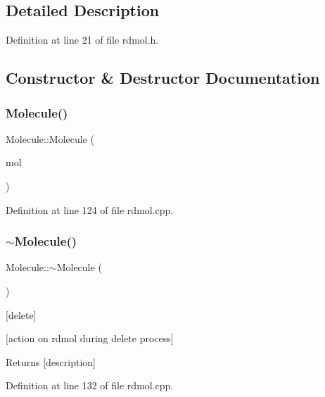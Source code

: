 \subsection{Detailed Description}


Definition at line 21 of file rdmol.\+h.



\subsection{Constructor \& Destructor Documentation}
\mbox{\label{class_molecule_a552677256bff6acac003617eddaa4233}} 
\subsubsection{\texorpdfstring{Molecule()}{Molecule()}}
{\footnotesize\ttfamily Molecule\+::\+Molecule (\begin{DoxyParamCaption}\item[{R\+W\+Mol $\ast$}]{mol }\end{DoxyParamCaption})}



Definition at line 124 of file rdmol.\+cpp.

\mbox{\label{class_molecule_a1ff980b574a62526abff3d631c83bf94}} 
\subsubsection{\texorpdfstring{$\sim$\+Molecule()}{~Molecule()}}
{\footnotesize\ttfamily Molecule\+::$\sim$\+Molecule (\begin{DoxyParamCaption}{ }\end{DoxyParamCaption})}



\mbox{[}delete\mbox{]} 

\mbox{[}action on rdmol during delete process\mbox{]} \begin{DoxyReturn}{Returns}
\mbox{[}description\mbox{]} 
\end{DoxyReturn}


Definition at line 132 of file rdmol.\+cpp.



